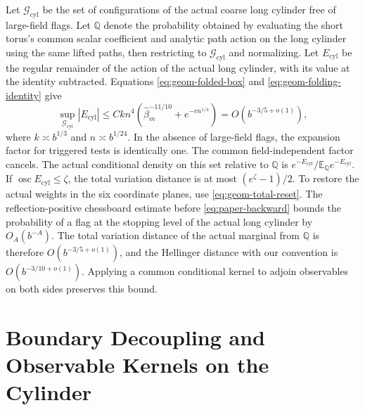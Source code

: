 \documentclass[11pt,a4paper]{article}
\numberwithin{equation}{section}
\begin{document}
Let \(\mathcal G_{\mathrm{cyl}}\) be the set of configurations of the actual coarse long cylinder free of large-field flags. Let \(\mathbb Q\) denote the probability obtained by evaluating the short torus's common scalar coefficient and analytic path action on the long cylinder using the same lifted paths, then restricting to \(\mathcal G_{\mathrm{cyl}}\) and normalizing. Let \(E_{\mathrm{cyl}}\) be the regular remainder of the action of the actual long cylinder, with its value at the identity subtracted. Equations \eqref{eq:geom-folded-box} and \eqref{eq:geom-folding-identity} give
\begin{equation}
 \sup_{\mathcal G_{\mathrm{cyl}}}|E_{\mathrm{cyl}}|
 \le Ckn^4(\widehat\beta_m^{-11/10}+e^{-c n^{1/4}})
                  =O(b^{-3/5+o(1)}),
 \label{eq:geom-folded-cylinder}
\end{equation}
where \(k\asymp b^{1/3}\) and \(n\asymp b^{1/24}\). In the absence of large-field flags, the expansion factor for triggered tests is identically one. The common field-independent factor cancels. The actual conditional density on this set relative to \(\mathbb Q\) is \(e^{-E_{\mathrm{cyl}}}/\mathbb E_{\mathbb Q}e^{-E_{\mathrm{cyl}}}\). If \(\operatorname{osc}E_{\mathrm{cyl}}\le\zeta\), the total variation distance is at most \((e^\zeta-1)/2\). To restore the actual weights in the six coordinate planes, use \eqref{eq:geom-total-reset}. The reflection-positive chessboard estimate before \eqref{eq:paper-backward} bounds the probability of a flag at the stopping level of the actual long cylinder by \(O_A(b^{-A})\). The total variation distance of the actual marginal from \(\mathbb Q\) is therefore \(O(b^{-3/5+o(1)})\), and the Hellinger distance with our convention is \(O(b^{-3/10+o(1)})\). Applying a common conditional kernel to adjoin observables on both sides preserves this bound.

\section{Boundary Decoupling and Observable Kernels on the Cylinder}
\label{cam-bound-section}
\end{document}
